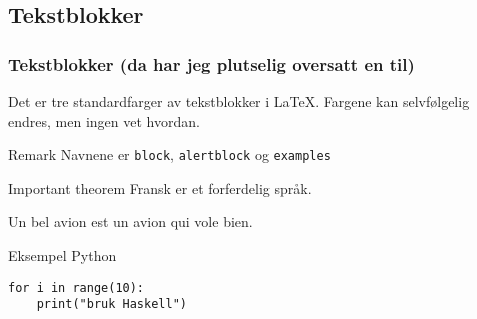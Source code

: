 \begin{frame}
\subsection*{Tekstblokker}
    \frametitle{Tekstblokker (da har jeg plutselig oversatt en til)}
    
    Det er tre standardfarger av tekstblokker i \LaTeX. Fargene kan selvfølgelig endres, men ingen vet hvordan.
    
    \begin{block}{Remark}
    Navnene er \texttt{block}, \texttt{alertblock} og \texttt{examples}
    \end{block}
   
    \begin{alertblock}{Important theorem}
    Fransk er et forferdelig språk.
    \end{alertblock}
    
    \begin{examples}
    Un bel avion est un avion qui vole bien.
    \end{examples}
\end{frame}

\begin{frame}[fragile]{Eksempel Python}
\begin{verbatim}
for i in range(10):
    print("bruk Haskell")
\end{verbatim}
\end{frame}


